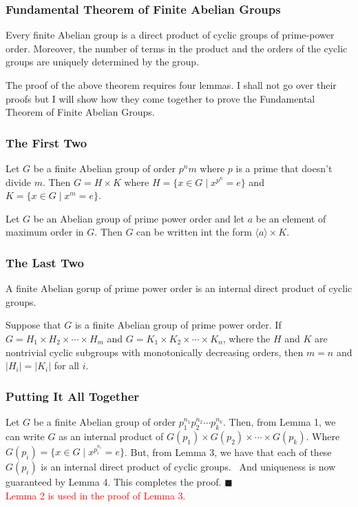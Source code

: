\documentclass{beamer}
\begin{document}
	\begin{frame}
		\frametitle{Fundamental Theorem of Finite Abelian Groups}
		\begin{theorem}
			Every finite Abelian group is a direct product of cyclic groups of prime-power order. Moreover, the number of terms in the product and the orders of the cyclic groups are uniquely determined by the group.
		\end{theorem}
		The proof of the above theorem requires four lemmas. I shall not go over their proofs but I will show how they come together to prove the Fundamental Theorem of Finite Abelian Groups.
	\end{frame}
	\begin{frame}
		\frametitle{The First Two}
		\begin{lemma}
			Let $G$ be a finite Abelian group of order $p^nm$ where $p$ is a prime that doesn't divide $m$. Then $G = H\times K$ where $H = \{x\in G\mid x^{p^n} = e\}$ and $K=\{x\in G\mid x^m = e\}$.
		\end{lemma}
		\begin{lemma}
			Let $G$ be an Abelian group of prime power order and let $a$ be an element of maximum order in $G$. Then $G$ can be written int the form $\langle a\rangle\times K$.
		\end{lemma}
	\end{frame}
	
	\begin{frame}
		\frametitle{The Last Two}
		\begin{lemma}
			A finite Abelian gorup of prime power order is an internal direct product of cyclic groups.
		\end{lemma}
		
		\begin{lemma}
			Suppose that $G$ is a finite Abelian group of prime power order. If $G=H_1\times H_2\times\cdots\times H_m$ and $G=K_1\times K_2\times\cdots\times K_n$, where the $H$ and $K$ are nontrivial cyclic subgroups with monotonically decreasing orders, then $m = n$ and $|H_i| = |K_i|$ for all $i$.
		\end{lemma}
	\end{frame}
	
	\begin{frame}
		\frametitle{Putting It All Together}
		Let $G$ be a finite Abelian group of order $p_1^{n_1}p_2^{n_2}\cdots p_k^{n_k}$. Then, from Lemma 1, we can write $G$ as an internal product of $G(p_1)\times G(p_2)\times\cdots\times G(p_k)$. Where $G(p_i) = \{x\in G\mid x^{p_i^{n_i}} = e\}$. But, from Lemma 3, we have that each of these $G(p_i)$ is an internal direct product of cyclic groups.~ And uniqueness is now guaranteed by Lemma 4. This completes the proof. $\blacksquare$\\
		
		\textcolor{red}{Lemma 2 is used in the proof of Lemma 3.}
	\end{frame}
\end{document}
